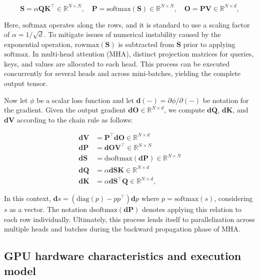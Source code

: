 \begin{equation*}
  \mathbf{S} = \alpha \mathbf{Q} \mathbf{K}^\top \in \mathbb{R}^{N \times N}, \quad \mathbf{P} = \mathrm{softmax}(\mathbf{S}) \in \mathbb{R}^{N \times N}, \quad \mathbf{O} = \mathbf{P}\mathbf{V} \in \mathbb{R}^{N \times d},
\end{equation*}

Here, $\mathrm{softmax}$ operates along the rows, and it is standard to use a scaling factor of $\alpha = 1/\sqrt{d}$. To mitigate issues of numerical instability caused by the exponential operation, $\mathrm{rowmax}(\mathbf{S})$ is subtracted from $\mathbf{S}$ prior to applying $\mathrm{softmax}$. In multi-head attention (MHA), distinct projection matrices for queries, keys, and values are allocated to each head. This process can be executed concurrently for several heads and across mini-batches, yielding the complete output tensor.

Now let $\phi$ be a scalar loss function and let $\mathbf{d}(-) = \partial \phi / \partial (-)$ be notation for the gradient. Given the output gradient $\mathbf{dO} \in \mathbb{R}^{N \times d}$, we compute $\mathbf{dQ}$, $\mathbf{dK}$, and $\mathbf{dV}$ according to the chain rule as follows:

\begin{align*}
  \mathbf{dV} &= \mathbf{P}^\top \mathbf{dO} \in \mathbb{R}^{N \times d} \\
  \mathbf{dP} &= \mathbf{dO} \mathbf{V}^\top \in \mathbb{R}^{N \times N} \\
  \mathbf{dS} &= \mathrm{dsoftmax} (\mathbf{dP}) \in \mathbb{R}^{N \times N} \\
  \mathbf{dQ} &= \alpha \mathbf{dS} \mathbf{K} \in \mathbb{R}^{N \times d} \\
  \mathbf{dK} &= \alpha \mathbf{dS}^\top \mathbf{Q} \in \mathbb{R}^{N \times d},
\end{align*}

In this context, $\mathbf{d}s = (\mathrm{diag}(p) - p p^\top)\mathbf{d}p$ where $p = \mathrm{softmax}(s)$, considering $s$ as a vector. The notation $\mathrm{dsoftmax}(\mathbf{dP})$ denotes applying this relation to each row individually. Ultimately, this process lends itself to parallelization across multiple heads and batches during the backward propagation phase of MHA.

\subsection{GPU hardware characteristics and execution model}
\label{subsec:hardware}

